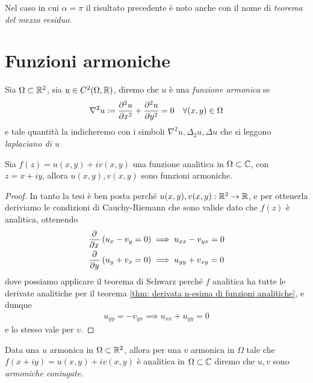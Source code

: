 Nel caso in cui $ \alpha = \pi $ il risultato precedente è noto anche con il nome di \textit{teorema del mezzo residuo}.

\section{Funzioni armoniche}
\begin{definition}
  Sia $ \Omega \subset \R^2 $, sia $ u \in C^2(\Omega, \R) $, diremo che $ u $ è una \textit{funzione armonica} se 
  \begin{align}
    \nabla^2 u \coloneq \der[2]{u}{x} + \der[2]{u}{y} = 0 \quad \forall (x,y) \in \Omega
  \end{align}
  e tale quantità la indicheremo con i simboli $ \nabla^2u, \Delta_2 u, \Delta u $ che si leggono \textit{laplaciano di $ u $}
\end{definition}
\begin{theorem}[  ]
  Sia $ f(z) = u(x,y) + i v(x,y) $ una funzione analitica in $ \Omega \subset \C $, con $ z = x + iy $, allora $ u(x,y), v(x,y) $ sono funzioni armoniche. 
\end{theorem}
\begin{proof}
  In tanto la tesi è ben posta perché $ u(x,y), v(x,y): \R^2 \to \R $, e per ottenerla deriviamo le condizioni di Cauchy-Riemann che sono valide 
  dato che $ f(z) $ è analitica, ottenendo
  \begin{align}
    \der{}{x} \left( u_x - v_y = 0 \right) &\implies u_{xx} - v_{yx} = 0
    \\
    \der{}{y} \left( u_y + v_x = 0 \right) &\implies u_{yy} + v_{xy} = 0
  \end{align} 
  dove possiamo applicare il teorema di Schwarz perché $ f $ analitica ha tutte le derivate analitiche per il teorema 
  \ref{thm: derivata n-esima di funzioni analitiche}, e dunque 
  \begin{align}
    u_{yy} = - v_{yx} \implies u_{xx} + u_{yy} = 0
  \end{align}
  e lo stesso vale per $ v $.
\end{proof}
\begin{definition}
  Data una $ u $ armonica in $ \Omega \subset \R^2 $, allora per una $ v $ armonica in $ \Omega $ tale che $ f(x + i y) = u(x,y) + i v(x,y) $ è 
  analitica in $ {\Omega} \subset \C $ diremo che $ u,v $ sono \textit{armoniche coniugate}.
\end{definition}


